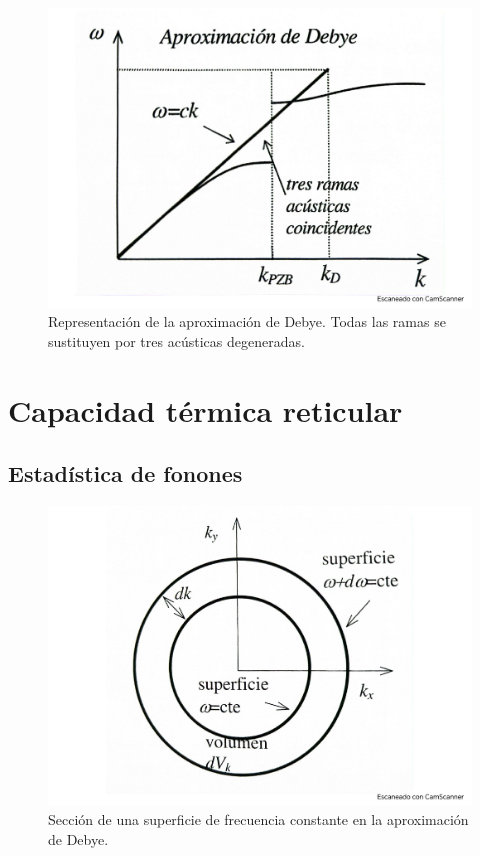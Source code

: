 \begin{figure}[h!] \centering
    \includegraphics[scale=0.43]{Cuerpo/Ch_05/Fotos libro 2.pdf}
    \caption{Representación de la aproximación de Debye. Todas las ramas se sustituyen por tres acústicas degeneradas.}
    \label{Fig:05-02}
\end{figure}    


\section{Capacidad térmica reticular}

\subsection{Estadística de fonones}

\begin{figure}[h!] \centering
    \includegraphics[scale=0.5]{Cuerpo/Ch_05/Fotos libro 3.pdf}
    \caption{Sección de una superficie de frecuencia constante en la aproximación de Debye.}
    \label{Fig:05-03}
\end{figure}    


